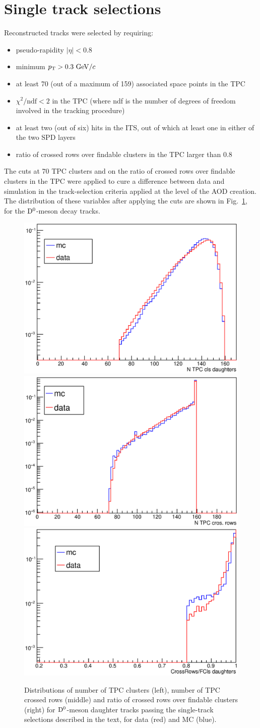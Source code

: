 \section{Single track selections}
Reconstructed tracks were selected by requiring:
\begin{itemize}
\item pseudo-rapidity $|\eta| < 0.8$
\item minimum $p_{\rm T} > 0.3~\mathrm{GeV}/c$
\item at least 70 (out of a maximum of 159) associated space points in the TPC
\item $\chi^2/\mathrm{ndf} < 2$ in the TPC (where ndf is the number of degrees of 
freedom involved in the tracking procedure)
\item at least two (out of six) hits in the ITS, out of which at least one 
in either of the two SPD layers
\item ratio of crossed rows over findable clusters in the TPC larger than 0.8
\end{itemize}
The cuts at 70 TPC clusters and on the ratio of crossed rows over findable clusters in the 
TPC were applied to cure a difference between data and simulation 
in the track-selection criteria applied at the level of the AOD creation.
The distribution of these variables after applying the cuts 
are shown in Fig.~\ref{fig:singtrafter}, for the ${\rm D^0}$-meson decay tracks.
\begin{figure}[!htbp]
\begin{center}
\includegraphics[width=.32\textwidth]{FigCap4/TPCclusters_AfterCut.eps}
\includegraphics[width=.32\textwidth]{FigCap4/TPCcrossRows_AfterCut.eps}
\includegraphics[width=.32\textwidth]{FigCap4/TPCCrossRowsFcls_AfterCut08}
\label{fig:singtrafter}
\caption{Distributions of number of TPC clusters (left), number of TPC crossed rows (middle) and
ratio of crossed rows over findable clusters (right) for ${\rm D^0}$-meson daughter tracks 
passing the single-track selections described in the 
text, for data (red) and MC (blue).}
\end{center}
\end{figure}
